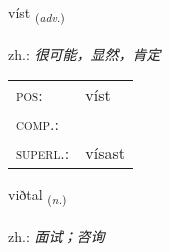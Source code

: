 \documentclass[frontgrid, backgrid]{flacards}\usepackage[]{graphicx}\usepackage[]{xcolor}
\begin{document}
\renewcommand{\flhead}{\vskip5pt \fboxsep=0pt {\small\bfseries\footnotesize Atviksorð | 副词}}
\renewcommand{\fcfoot}{\vskip5pt \fboxsep=0pt \hspace{2pt}{\small\bfseries\footnotesize 1K}}

\renewcommand{\blhead}{\vskip5pt {\small\bfseries\footnotesize Atviksorð | 副词 }}
\renewcommand{\bcfoot}{\vskip5pt \hspace{2pt}{\small\bfseries\footnotesize 1K}}


{víst \small{\textsubscript{(\textit{adv.})}} \\[1ex] %
\textphonetic{[vist]} \\
zh.: \emph{很可能，显然，肯定} \\  [2ex]
\renewcommand*{\arraystretch}{0.8}
\begin{tabular}{ll}
\textsc{pos}: & víst \\ 
\textsc{comp.}: &  \\ 
\textsc{superl.}: & vísast \\
\end{tabular}
}

\renewcommand{\flhead}{\vskip5pt \fboxsep=0pt {\small\bfseries\footnotesize Nafnorð | 名词}}
\renewcommand{\fcfoot}{\vskip5pt \fboxsep=0pt \hspace{2pt}{\small\bfseries\footnotesize 1K}}

\renewcommand{\blhead}{\vskip5pt {\small\bfseries\footnotesize Nafnorð | 名词 }}
\renewcommand{\bcfoot}{\vskip5pt \hspace{2pt}{\small\bfseries\footnotesize 1K}}


{viðtal \small{\textsubscript{(\textit{n.})}} \\[1ex] %
\textphonetic{[vɪðtʰal]} \\
zh.: \emph{面试；咨询} \\  [2ex]
\renewcommand*{\arraystretch}{0.8}
}
\end{document}
